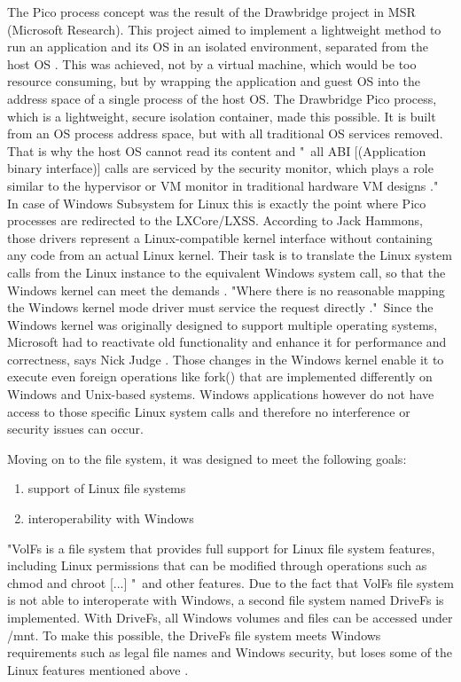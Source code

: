 \documentclass[utf8,biblatex, ngerman, english]{lni}
\begin{document}
The Pico process concept was the result of the Drawbridge project in MSR (Microsoft Research). This project aimed to implement a lightweight method to run an application and its OS in an isolated environment, separated from the host OS \cite{Ha16a}. This was achieved, not by a virtual machine, which would be too resource consuming, but by wrapping the application and guest OS into the address space of a single process of the host OS. The Drawbridge Pico process, which is a lightweight, secure isolation container, made this possible. It is built from an OS process address space, but with all traditional OS services removed. That is why the host OS cannot read its content and "\ all ABI [(Application binary interface)] calls are serviced by the security monitor, which plays a role similar to the hypervisor or VM monitor in traditional hardware VM designs \cite{11}."\\
In case of Windows Subsystem for Linux this is exactly the point where Pico processes are redirected to the LXCore/LXSS. 
According to Jack Hammons, those drivers represent a Linux-compatible kernel interface without containing any code from an actual Linux kernel. Their task is to translate the Linux system calls from the Linux instance to the equivalent Windows system call, so that the Windows kernel can meet the demands \cite{Ha16b}. 
"Where there is no reasonable mapping the Windows kernel mode driver must service the request directly \cite{Ha16b}."\ Since the Windows kernel was originally designed to support multiple operating systems, Microsoft had to reactivate old functionality and enhance it for performance and correctness, says Nick Judge \cite{Ha16a}. Those changes in the Windows kernel enable it to execute even foreign operations like fork() that are implemented differently on Windows and Unix-based systems. Windows applications however do not have access to those specific Linux system calls and therefore no interference or security issues can occur.

Moving on to the file system, it was designed to meet the following goals:
\begin{enumerate}
    \item support of Linux file systems
    \item interoperability with Windows
\end{enumerate} \cite{Ha16b}

"VolFs is a file system that provides full support for Linux file system features, including Linux permissions that can be modified through operations such as chmod and chroot [...] \cite{Ha16b}"\ and other features. Due to the fact that VolFs file system is not able to interoperate with Windows, a second file system named DriveFs is implemented. With DriveFs, all Windows volumes and files can be accessed under /mnt. To make this possible, the DriveFs file system meets Windows requirements such as legal file names and Windows security, but loses some of the Linux features mentioned above \cite{Ha16b}.
\end{document}
